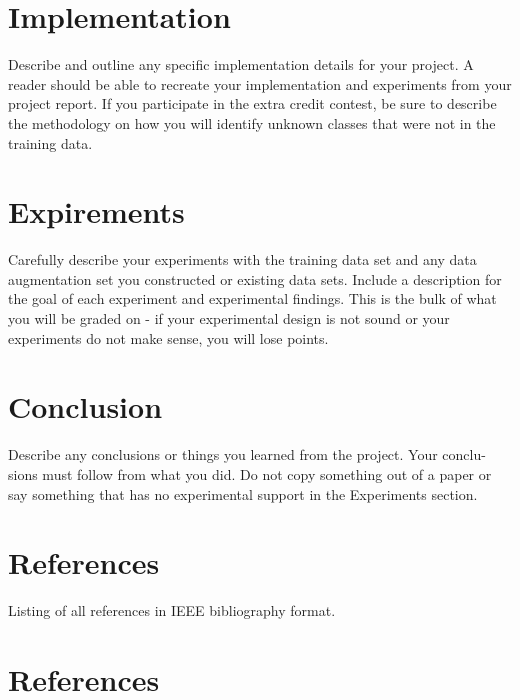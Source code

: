 \documentclass[conference]{IEEEtran}
\begin{document}
\section{Implementation}
Describe and outline any specific implementation details for your project. A reader should be able to recreate your implementation and experiments from your project report. If you participate in the extra credit contest, be sure to describe the methodology on how you will identify unknown classes that were not in the training data.

\section{Expirements}
Carefully describe your experiments with the training data set and any data augmentation set you constructed or existing data sets. Include a description for the goal of each experiment and experimental findings. This is the bulk of what you will be graded on - if your experimental design is not sound or your experiments do not make sense, you will lose points.

\section{Conclusion}
Describe any conclusions or things you learned from the project. Your conclu- sions must follow from what you did. Do not copy something out of a paper or say something that has no experimental support in the Experiments section.

\section{References}
Listing of all references in IEEE bibliography format.

\section*{References}



\end{document}
